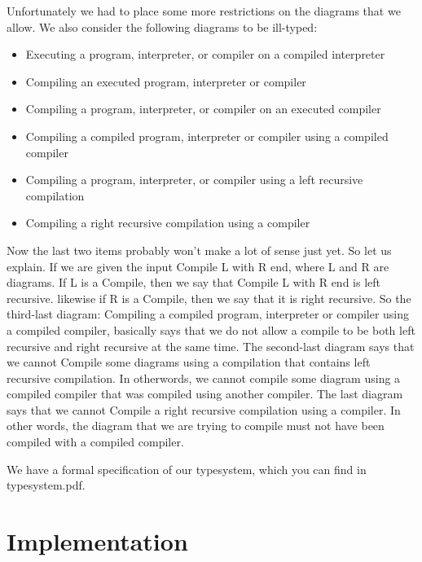 \documentclass{article}
\begin{document}
Unfortunately we had to place some more restrictions on the diagrams that we allow. We also consider the following diagrams to be ill-typed:

\begin{itemize}
	\item Executing a program, interpreter, or compiler on a compiled interpreter
	\item Compiling an executed program, interpreter or compiler
	\item Compiling a program, interpreter, or compiler on an executed compiler
	\item Compiling a compiled program, interpreter or compiler using a compiled compiler
	\item Compiling a program, interpreter, or compiler using a left recursive compilation
	\item Compiling a right recursive compilation using a compiler
\end{itemize}

Now the last two items probably won't make a lot of sense just yet. So let us explain. If we are given the input Compile L with R end,
where L and R are diagrams. If L is a Compile, then we say that Compile L with R end is left recursive. likewise if R is a Compile, then we say that it is right recursive.
So the third-last diagram: Compiling a compiled program, interpreter or compiler using a compiled compiler, basically says that we do not allow a compile to be both left recursive and right recursive at the same time. The second-last diagram says that we cannot Compile some diagrams using a compilation that contains left recursive compilation. In otherwords, we cannot compile some diagram using a compiled compiler that was compiled using another compiler. The last diagram says that we cannot Compile a right recursive compilation using a compiler.
In other words, the diagram that we are trying to compile must not have been compiled with a compiled compiler.

\hfill \break

We have a formal specification of our typesystem, which you can find in typesystem.pdf.

\section{Implementation}
\end{document}
